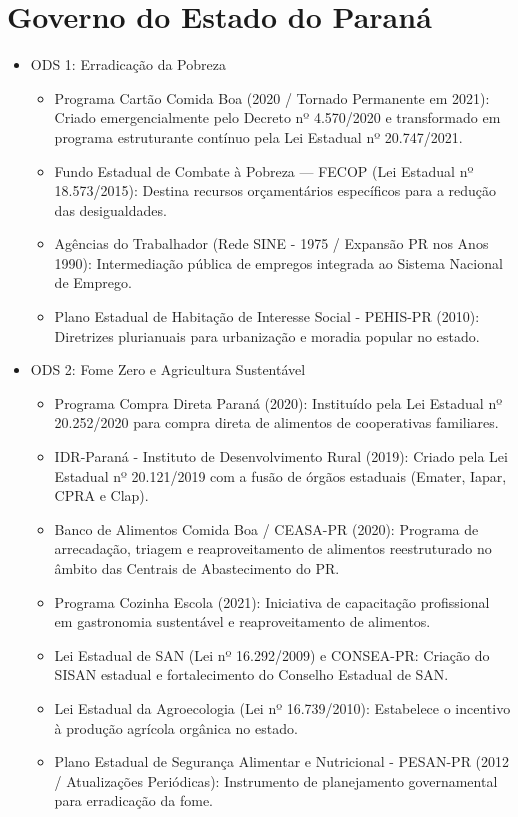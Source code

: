 \section{Governo do Estado do Paraná}
\begin{itemize}
\item ODS 1: Erradicação da Pobreza
\begin{itemize}
\item Programa Cartão Comida Boa (2020 / Tornado Permanente em 2021): Criado emergencialmente pelo Decreto nº 4.570/2020 e transformado em programa estruturante contínuo pela Lei Estadual nº 20.747/2021.
\item Fundo Estadual de Combate à Pobreza — FECOP (Lei Estadual nº 18.573/2015): Destina recursos orçamentários específicos para a redução das desigualdades.
\item Agências do Trabalhador (Rede SINE - 1975 / Expansão PR nos Anos 1990): Intermediação pública de empregos integrada ao Sistema Nacional de Emprego.
\item Plano Estadual de Habitação de Interesse Social - PEHIS-PR (2010): Diretrizes plurianuais para urbanização e moradia popular no estado.
\end{itemize}
\item ODS 2: Fome Zero e Agricultura Sustentável
\begin{itemize}
\item Programa Compra Direta Paraná (2020): Instituído pela Lei Estadual nº 20.252/2020 para compra direta de alimentos de cooperativas familiares.
\item IDR-Paraná - Instituto de Desenvolvimento Rural (2019): Criado pela Lei Estadual nº 20.121/2019 com a fusão de órgãos estaduais (Emater, Iapar, CPRA e Clap).
\item Banco de Alimentos Comida Boa / CEASA-PR (2020): Programa de arrecadação, triagem e reaproveitamento de alimentos reestruturado no âmbito das Centrais de Abastecimento do PR.
\item Programa Cozinha Escola (2021): Iniciativa de capacitação profissional em gastronomia sustentável e reaproveitamento de alimentos.
\item Lei Estadual de SAN (Lei nº 16.292/2009) e CONSEA-PR: Criação do SISAN estadual e fortalecimento do Conselho Estadual de SAN.
\item Lei Estadual da Agroecologia (Lei nº 16.739/2010): Estabelece o incentivo à produção agrícola orgânica no estado.
\item Plano Estadual de Segurança Alimentar e Nutricional - PESAN-PR (2012 / Atualizações Periódicas): Instrumento de planejamento governamental para erradicação da fome.
\end{itemize}
\end{itemize}
